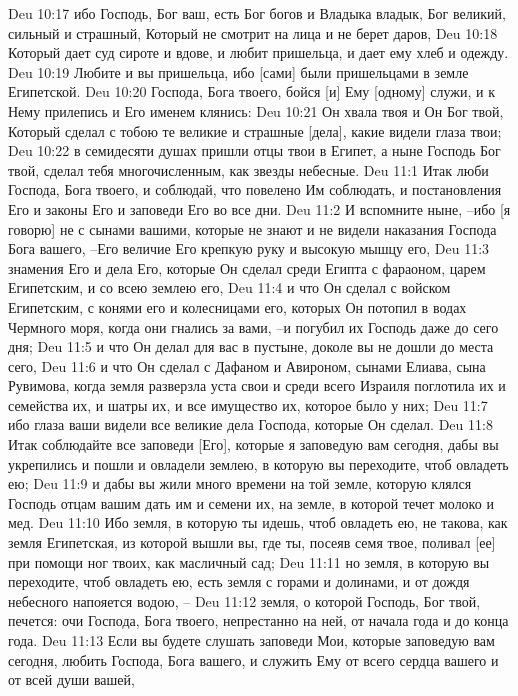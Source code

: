 Deu 10:17  ибо Господь, Бог ваш, есть Бог богов и Владыка владык, Бог великий, сильный и страшный, Который не смотрит на лица и не берет даров,
Deu 10:18  Который дает суд сироте и вдове, и любит пришельца, и дает ему хлеб и одежду.
Deu 10:19  Любите и вы пришельца, ибо [сами] были пришельцами в земле Египетской.
Deu 10:20  Господа, Бога твоего, бойся [и] Ему [одному] служи, и к Нему прилепись и Его именем клянись:
Deu 10:21  Он хвала твоя и Он Бог твой, Который сделал с тобою те великие и страшные [дела], какие видели глаза твои;
Deu 10:22  в семидесяти душах пришли отцы твои в Египет, а ныне Господь Бог твой, сделал тебя многочисленным, как звезды небесные.
Deu 11:1  Итак люби Господа, Бога твоего, и соблюдай, что повелено Им соблюдать, и постановления Его и законы Его и заповеди Его во все дни.
Deu 11:2  И вспомните ныне, --ибо [я говорю] не с сынами вашими, которые не знают и не видели наказания Господа Бога вашего, --Его величие Его крепкую руку и высокую мышцу его,
Deu 11:3  знамения Его и дела Его, которые Он сделал среди Египта с фараоном, царем Египетским, и со всею землею его,
Deu 11:4  и что Он сделал с войском Египетским, с конями его и колесницами его, которых Он потопил в водах Чермного моря, когда они гнались за вами, --и погубил их Господь даже до сего дня;
Deu 11:5  и что Он делал для вас в пустыне, доколе вы не дошли до места сего,
Deu 11:6  и что Он сделал с Дафаном и Авироном, сынами Елиава, сына Рувимова, когда земля разверзла уста свои и среди всего Израиля поглотила их и семейства их, и шатры их, и все имущество их, которое было у них;
Deu 11:7  ибо глаза ваши видели все великие дела Господа, которые Он сделал.
Deu 11:8  Итак соблюдайте все заповеди [Его], которые я заповедую вам сегодня, дабы вы укрепились и пошли и овладели землею, в которую вы переходите, чтоб овладеть ею;
Deu 11:9  и дабы вы жили много времени на той земле, которую клялся Господь отцам вашим дать им и семени их, на земле, в которой течет молоко и мед.
Deu 11:10  Ибо земля, в которую ты идешь, чтоб овладеть ею, не такова, как земля Египетская, из которой вышли вы, где ты, посеяв семя твое, поливал [ее] при помощи ног твоих, как масличный сад;
Deu 11:11  но земля, в которую вы переходите, чтоб овладеть ею, есть земля с горами и долинами, и от дождя небесного напояется водою, --
Deu 11:12  земля, о которой Господь, Бог твой, печется: очи Господа, Бога твоего, непрестанно на ней, от начала года и до конца года.
Deu 11:13  Если вы будете слушать заповеди Мои, которые заповедую вам сегодня, любить Господа, Бога вашего, и служить Ему от всего сердца вашего и от всей души вашей,
